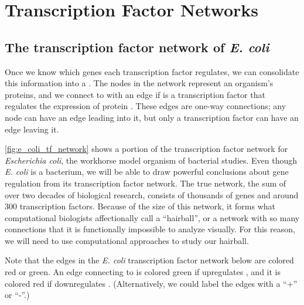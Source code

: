 \FloatBarrier
{}

\section{Transcription Factor Networks}
\label{sec:transcription_factor_networks}

\subsection{The transcription factor network of \textit{E. coli}}

Once we know which genes each transcription factor regulates, we can consolidate this information into a . The nodes in the network represent an organism's proteins, and we connect  to  with an edge if  is a transcription factor that regulates the expression of protein . These edges are one-way connections; any node can have an edge leading into it, but only a transcription factor can have an edge leaving it.

\autoref{fig:e_coli_tf_network} shows a portion of the transcription factor network for \textit{Escherichia coli}, the workhorse model organism of bacterial studies. Even though \textit{E. coli} is a bacterium, we will be able to draw powerful conclusions about gene regulation from its transcription factor network. The true network, the sum of over two decades of biological research, consists of thousands of genes and around 300 transcription factors. Because of the size of this network, it forms what computational biologists affectionally call a ``hairball'', or a network with so many connections that it is functionally impossible to analyze visually. For this reason, we will need to use computational approaches to study our hairball.

Note that the edges in the \textit{E. coli} transcription factor network below are colored red or green. An edge connecting  to  is colored green if  upregulates , and it is colored red if  downregulates . (Alternatively, we could label the edges with a ``+'' or ``-''.)\\

